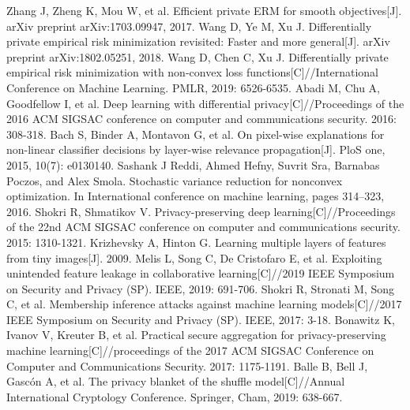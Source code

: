 \documentclass[12pt,openany,a4paper,fancyhdr,oneside]{ctexbook}
\begin{document}
\begin{thebibliography}{99}
Zhang J, Zheng K, Mou W, et al. Efficient private ERM for smooth objectives[J]. arXiv preprint arXiv:1703.09947, 2017.
Wang D, Ye M, Xu J. Differentially private empirical risk minimization revisited: Faster and more general[J]. arXiv preprint arXiv:1802.05251, 2018.
Wang D, Chen C, Xu J. Differentially private empirical risk minimization with non-convex loss functions[C]//International Conference on Machine Learning. PMLR, 2019: 6526-6535.
Abadi M, Chu A, Goodfellow I, et al. Deep learning with differential privacy[C]//Proceedings of the 2016 ACM SIGSAC conference on computer and communications security. 2016: 308-318.
Bach S, Binder A, Montavon G, et al. On pixel-wise explanations for non-linear classifier decisions by layer-wise relevance propagation[J]. PloS one, 2015, 10(7): e0130140.
Sashank J Reddi, Ahmed Hefny, Suvrit Sra, Barnabas Poczos, and Alex Smola. Stochastic variance reduction for nonconvex optimization. In International conference on machine learning, pages 314–323, 2016.
Shokri R, Shmatikov V. Privacy-preserving deep learning[C]//Proceedings of the 22nd ACM SIGSAC conference on computer and communications security. 2015: 1310-1321.
Krizhevsky A, Hinton G. Learning multiple layers of features from tiny images[J]. 2009.
Melis L, Song C, De Cristofaro E, et al. Exploiting unintended feature leakage in collaborative learning[C]//2019 IEEE Symposium on Security and Privacy (SP). IEEE, 2019: 691-706.
Shokri R, Stronati M, Song C, et al. Membership inference attacks against machine learning models[C]//2017 IEEE Symposium on Security and Privacy (SP). IEEE, 2017: 3-18.
Bonawitz K, Ivanov V, Kreuter B, et al. Practical secure aggregation for privacy-preserving machine learning[C]//proceedings of the 2017 ACM SIGSAC Conference on Computer and Communications Security. 2017: 1175-1191.
Balle B, Bell J, Gascón A, et al. The privacy blanket of the shuffle model[C]//Annual International Cryptology Conference. Springer, Cham, 2019: 638-667.

\end{thebibliography}


\pagestyle{plain}
\clearpage
{}
{}


\pagestyle{plain}
\clearpage
{}
{}



\printindex
\end{document}
